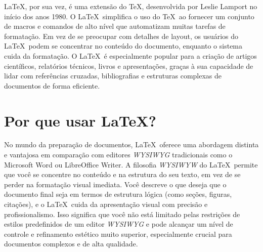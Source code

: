 \LaTeX, por sua vez, é uma extensão do \TeX, desenvolvida por Leslie Lamport no início dos anos 1980. O \LaTeX\ simplifica o uso do \TeX\ ao fornecer um conjunto de macros e comandos de alto nível que automatizam muitas tarefas de formatação. Em vez de se preocupar com detalhes de layout, os usuários do \LaTeX\ podem se concentrar no conteúdo do documento, enquanto o sistema cuida da formatação. O \LaTeX\ é especialmente popular para a criação de artigos científicos, relatórios técnicos, livros e apresentações, graças à sua capacidade de lidar com referências cruzadas, bibliografias e estruturas complexas de documentos de forma eficiente.



%

\section{Por que usar \LaTeX?}

No mundo da preparação de documentos, \LaTeX\ oferece uma abordagem distinta e vantajosa em comparação com editores \textit{WYSIWYG} tradicionais como o Microsoft Word ou LibreOffice Writer. A filosofia \textit{WYSIWYW} do \LaTeX\ permite que você se concentre no conteúdo e na estrutura do seu texto, em vez de se perder na formatação visual imediata.  Você descreve o que deseja que o documento final seja em termos de estrutura lógica (como seções, figuras, citações), e o \LaTeX\ cuida da apresentação visual com precisão e profissionalismo.  Isso significa que você não está limitado pelas restrições de estilos predefinidos de um editor \textit{WYSIWYG} e pode alcançar um nível de controle e refinamento estético muito superior, especialmente crucial para documentos complexos e de alta qualidade.

